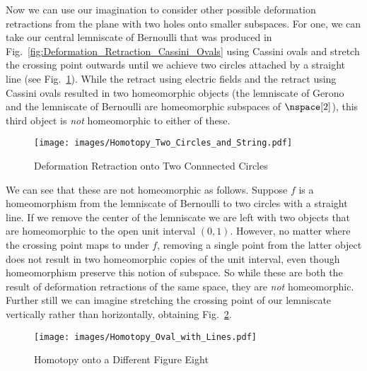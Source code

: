 \documentclass[oneside]{book}                                                  %
\begin{document}
                Now we can use our imagination to consider other possible
                deformation retractions from the plane with two holes onto
                smaller subspaces. For one, we can take our central lemniscate
                of Bernoulli that was produced in
                Fig.~\ref{fig:Deformation_Retraction_Cassini_Ovals} using
                Cassini ovals and stretch the crossing point outwards until we
                achieve two circles attached by a straight line
                (see Fig.~\ref{fig:Homotopy_Two_Circles_and_String}). While the
                retract using electric fields and the retract using Cassini
                ovals resulted in two homeomorphic objects (the lemniscate of
                Gerono and the lemniscate of Bernoulli are homeomorphic
                subspaces of $\nspace[2]$), this third object is \textit{not}
                homeomorphic to either of these.
                \begin{figure}[H]
                    \centering
                    \captionsetup{type=figure}
                    \texttt{[image: images/Homotopy\_Two\_Circles\_and\_String.pdf]}
                    \caption{Deformation Retraction onto Two Connnected Circles}
                    \label{fig:Homotopy_Two_Circles_and_String}
                \end{figure}
                We can see that these are not homeomorphic as follows. Suppose
                $f$ is a homeomorphism from the lemniscate of Bernoulli to two
                circles with a straight line. If we remove the center of the
                lemniscate we are left with two objects that are homeomorphic to
                the open unit interval $(0,1)$. However, no matter where the
                crossing point maps to under $f$, removing a single point from
                the latter object does not result in two homeomorphic copies of
                the unit interval, even though homeomorphism preserve this
                notion of subspace. So while these are both the result of
                deformation retractions of the same space, they are \textit{not}
                homeomorphic. Further still we can imagine stretching the
                crossing point of our lemniscate vertically rather than
                horizontally, obtaining Fig.~\ref{fig:Homotopy_Oval_with_Line}.
                \begin{figure}[H]
                    \centering
                    \captionsetup{type=figure}
                    \texttt{[image: images/Homotopy\_Oval\_with\_Lines.pdf]}
                    \caption{Homotopy onto a Different Figure Eight}
                    \label{fig:Homotopy_Oval_with_Line}
                \end{figure}
\end{document}
